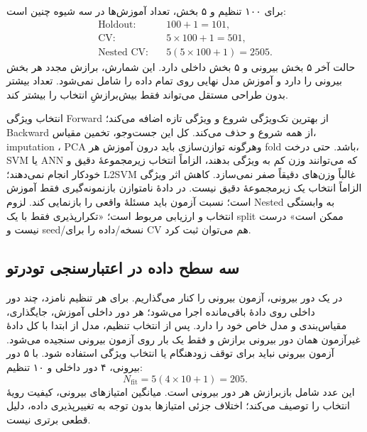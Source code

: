 \documentclass[12pt,a4paper,oneside]{report}
\newcounter{ex}[chapter]
\begin{document}
برای ۱۰۰ تنظیم و ۵ بخش، تعداد آموزش‌ها در سه شیوه چنین است:
\begin{align*}
\text{Holdout}:&\quad100+1=101,\\
\text{CV}:&\quad5\times100+1=501,\\
\text{Nested CV}:&\quad5(5\times100+1)=2505.
\end{align*}
حالت آخر ۵ بخش بیرونی و ۵ بخش داخلی دارد. این شمارش، برازش مجدد هر بخش بیرونی را دارد و آموزش مدل نهایی روی تمام داده را شامل نمی‌شود. تعداد بیشتر بدون طراحی مستقل می‌تواند فقط بیش‌برازشِ انتخاب را بیشتر کند.

انتخاب ویژگی Forward از بهترین تک‌ویژگی شروع و ویژگی تازه اضافه می‌کند؛ Backward از همه شروع و حذف می‌کند. کل این جست‌وجو، تخمین مقیاس، imputation ، PCA وهرگونه توازن‌سازی باید درون آموزش هر fold باشد. حتی درخت، SVM یا ANN که می‌توانند وزن کم به ویژگی بدهند، الزاماً انتخاب زیرمجموعهٔ دقیق و خودکار انجام نمی‌دهند؛ L2SVM غالباً وزن‌های دقیقاً صفر نمی‌سازد. کاهش اثر ویژگی الزاماً انتخاب یک زیرمجموعهٔ دقیق نیست. در دادهٔ نامتوازن بازنمونه‌گیری فقط آموزش است؛ نسبت آزمون باید مسئلهٔ واقعی را بازنمایی کند. لزوم Nested به وابستگی انتخاب و ارزیابی مربوط است؛ «تکرارپذیری فقط با یک split ممکن است» درست نیست و seed/نسخه/داده را برای CV هم می‌توان ثبت کرد.



\subsection*{سه سطح داده در اعتبارسنجی تودرتو}
در یک دور بیرونی، آزمون بیرونی را کنار می‌گذاریم. برای هر تنظیم نامزد، چند دور داخلی روی دادهٔ باقی‌مانده اجرا می‌شود؛ هر دور داخلی آموزش، جایگذاری، مقیاس‌بندی و مدل خاص خود را دارد. پس از انتخاب تنظیم، مدل از ابتدا با کل دادهٔ غیرآزمون همان دور بیرونی برازش و فقط یک بار روی آزمون بیرونی سنجیده می‌شود. آزمون بیرونی نباید برای توقف زودهنگام یا انتخاب ویژگی استفاده شود. با ۵ دور بیرونی، ۴ دور داخلی و ۱۰ تنظیم:
\[N_{\mathrm{fit}}=5(4\times10+1)=205.\]
این عدد شامل بازبرازش هر دور بیرونی است. میانگین امتیازهای بیرونی، کیفیت رویهٔ انتخاب را توصیف می‌کند؛ اختلاف جزئی امتیازها بدون توجه به تغییرپذیری داده، دلیل قطعی برتری نیست.
\end{document}
